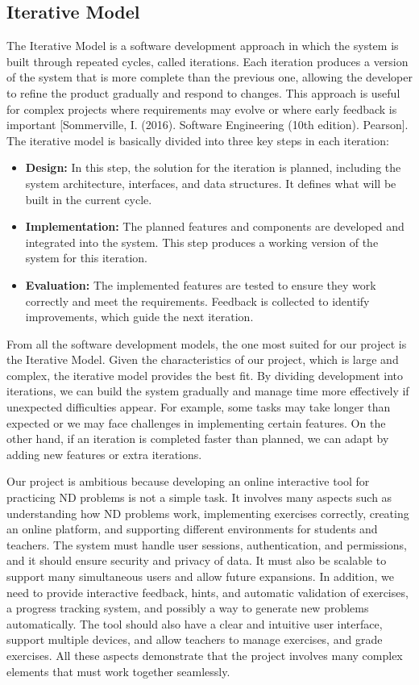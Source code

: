 \subsection{Iterative Model}
The Iterative Model is a software development approach in which the system is built through repeated cycles, called iterations. Each iteration produces a version of the system that is more complete than the previous one, allowing the developer to refine the product gradually and respond to changes. This approach is useful for complex projects where requirements may evolve or where early feedback is important [Sommerville, I. (2016). Software Engineering (10th edition). Pearson]. The iterative model is basically divided into three key steps in each iteration:

\begin{itemize}
    \item \textbf{Design:} In this step, the solution for the iteration is planned, including the system architecture, interfaces, and data structures. It defines what will be built in the current cycle.
    \item \textbf{Implementation:} The planned features and components are developed and integrated into the system. This step produces a working version of the system for this iteration.
    \item \textbf{Evaluation:} The implemented features are tested to ensure they work correctly and meet the requirements. Feedback is collected to identify improvements, which guide the next iteration.
\end{itemize}

From all the software development models, the one most suited for our project is the Iterative Model. Given the characteristics of our project, which is large and complex, the iterative model provides the best fit. By dividing development into iterations, we can build the system gradually and manage time more effectively if unexpected difficulties appear. For example, some tasks may take longer than expected or we may face challenges in implementing certain features. On the other hand, if an iteration is completed faster than planned, we can adapt by adding new features or extra iterations.

Our project is ambitious because developing an online interactive tool for practicing \gls{ND} problems is not a simple task. It involves many aspects such as understanding how \gls{ND} problems work, implementing exercises correctly, creating an online platform, and supporting different environments for students and teachers. The system must handle user sessions, authentication, and permissions, and it should ensure security and privacy of data. It must also be scalable to support many simultaneous users and allow future expansions. In addition, we need to provide interactive feedback, hints, and automatic validation of exercises, a progress tracking system, and possibly a way to generate new problems automatically. The tool should also have a clear and intuitive user interface, support multiple devices, and allow teachers to manage exercises, and grade exercises. All these aspects demonstrate that the project involves many complex elements that must work together seamlessly.


